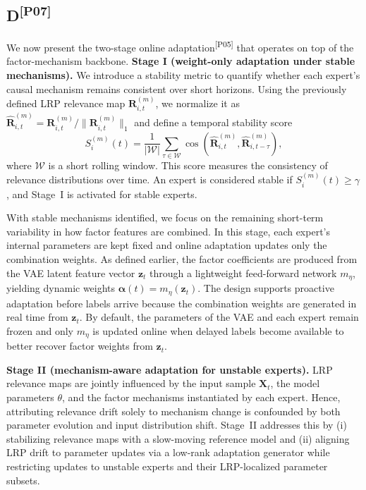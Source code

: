 ﻿\documentclass[journal]{IEEEtran}
\DeclareRobustCommand{\auditbad}[2]{{\color{auditred}#1}{\color{auditred}\textsuperscript{[#2]}}}
\begin{document}
\subsection{\auditbad{D}{P07}}
We now present the \auditbad{two-stage online adaptation}{P05} that operates on top of the factor-mechanism backbone.
\textbf{Stage I (weight-only adaptation under stable mechanisms).}
We introduce a stability metric to quantify whether each expert's causal mechanism remains consistent over short horizons. Using the previously defined LRP relevance map $\mathbf{R}_{i,t}^{(m)}$, we normalize it as $\hat{\mathbf{R}}_{i,t}^{(m)}=\mathbf{R}_{i,t}^{(m)}/\|\mathbf{R}_{i,t}^{(m)}\|_{1}$ and define a temporal stability score
\begin{equation}
S_{i}^{(m)}(t)=\frac{1}{|\mathcal{W}|}\sum_{\tau\in\mathcal{W}} \cos\!\left(\hat{\mathbf{R}}_{i,t}^{(m)},\hat{\mathbf{R}}_{i,t-\tau}^{(m)}\right),
\end{equation}
where $\mathcal{W}$ is a short rolling window. This score measures the consistency of relevance distributions over time. An expert is considered stable if $S_{i}^{(m)}(t)\ge\gamma$, and Stage~I is activated for stable experts.

With stable mechanisms identified, we focus on the remaining short-term variability in how factor features are combined. In this stage, each expert's internal parameters are kept fixed and online adaptation updates only the combination weights. As defined earlier, the factor coefficients are produced from the VAE latent feature vector $\mathbf{z}_t$ through a lightweight feed-forward network $m_{\eta}$, yielding dynamic weights $\boldsymbol{\alpha}(t)=m_{\eta}(\mathbf{z}_t)$.
The design supports proactive adaptation before labels arrive because the combination weights are generated in real time from $\mathbf{z}_t$. By default, the parameters of the VAE and each expert remain frozen and only $m_{\eta}$ is updated online when delayed labels become available to better recover factor weights from $\mathbf{z}_t$.

 \textbf{Stage II (mechanism-aware adaptation for unstable experts).}
LRP relevance maps are jointly influenced by the input sample $\mathbf{X}_t$, the model parameters $\theta$, and the factor mechanisms instantiated by each expert. Hence, attributing relevance drift solely to mechanism change is confounded by both parameter evolution and input distribution shift. Stage~II addresses this by (i) stabilizing relevance maps with a slow-moving reference model and (ii) aligning LRP drift to parameter updates via a low-rank adaptation generator while restricting updates to unstable experts and their LRP-localized parameter subsets.
\end{document}
